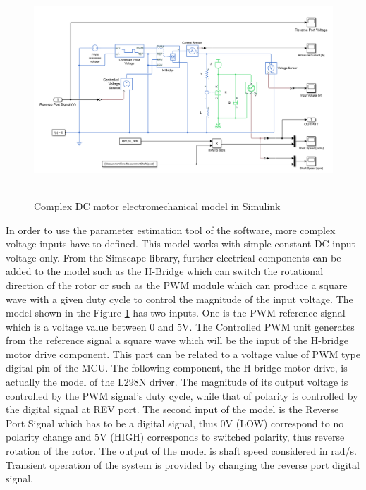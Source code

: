 \documentclass[12pt,english]{article}
\begin{document}
\begin{figure}[htb!]
	\centering
	\includegraphics[height=8cm]{figures/simulink_dc_motor_complex.png}
	\caption{Complex DC motor electromechanical model in Simulink}
	\label{simulink_dc_motor_complex}
\end{figure}
In order to use the parameter estimation tool of the software, more complex voltage inputs have to defined. This model works with simple constant DC input voltage only. From the Simscape library, further electrical components can be added to the model such as the H-Bridge which can switch the rotational direction of the rotor or such as the PWM module which can produce a square wave with a given duty cycle to control the magnitude of the input voltage. The model shown in the Figure \ref{simulink_dc_motor_complex} has two inputs. One is the PWM reference signal which is a voltage value between 0 and 5V. The Controlled PWM unit generates from the reference signal a square wave which will be the input of the H-bridge motor drive component. This part can be related to a voltage value of PWM type digital pin of the MCU. The following component, the H-bridge motor drive, is actually the model of the L298N driver. The magnitude of its output voltage is controlled by the PWM signal's duty cycle, while that of polarity is controlled by the digital signal at REV port. The second input of the model is the Reverse Port Signal which has to be a digital signal, thus 0V (LOW) correspond to no polarity change and 5V (HIGH) corresponds to switched polarity, thus reverse rotation of the rotor. The output of the model is shaft speed considered in rad/s. Transient operation of the system is provided by changing the reverse port digital signal. 
\end{document}
